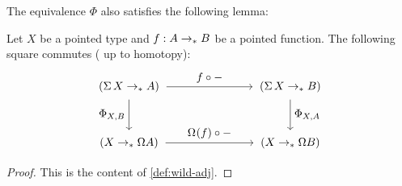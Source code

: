 \documentclass[english,a4paper]{lmcs}
\begin{document}
The equivalence $\Phi$ also satisfies the following lemma:
\begin{lem} \label{lem:ap-Sigma}
    Let $X$ be a pointed type and $f : A \to_\ast B$ be a pointed function.
    The following square commutes
    {\normalfont(}\kern-1pt up to homotopy{\normalfont)}:
    \begin{equation}
    \begin{tikzpicture}[x=5cm,y=-1.75cm,baseline=(current bounding box.center)]
    \tikzset{arrow/.style={shorten >=0.1cm,shorten <=.1cm,->}}
    \node (A) at (0,0) {$(\susp X \to_* A)$};
    \node (D) at (1,0) {$(\susp X \to_* B)$};
    \node (B) at (0,1) {$(X \to_* \Omega A)$};
    \node (C) at (1,1) {$(X \to_* \Omega B)$};

    \draw[arrow] (A) to node [above] {$f \circ \blank$} (D);
    \draw[arrow] (A) to node [left] {$\Phi_{X,B}$} (B);
    \draw[arrow] (B) to node [above] {$\loopspace\null (f) \circ \blank$} (C);
    \draw[arrow] (D) to node [right] {$\Phi_{X,A}$} (C);
    \end{tikzpicture}
    \end{equation}
\end{lem}
\begin{proof}
    This is the content of \cref{def:wild-adj}.
\end{proof}
\end{document}
